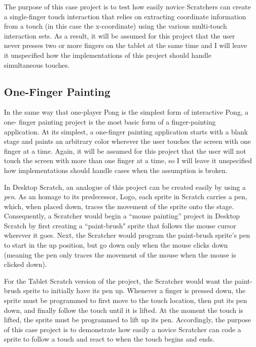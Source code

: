 The purpose of this case project is to test how easily novice Scratchers can create a single-finger touch interaction that relies on extracting coordinate information from a touch (in this case the x-coordinate) using the various multi-touch interaction sets. As a result, it will be assumed for this project that the user never presses two or more fingers on the tablet at the same time and I will leave it unspecified how the implementations of this project should handle simultaneous touches.

\subsection{One-Finger Painting}
In the same way that one-player Pong is the simplest form of interactive Pong, a one- finger painting project is the most basic form of a finger-painting application. At its simplest, a one-finger painting application starts with a blank stage and paints an arbitrary color wherever the user touches the screen with one finger at a time. Again, it will be assumed for this project that the user will not touch the screen with more than one finger at a time, so I will leave it unspecified how implementations should handle cases when the assumption is broken.

In Desktop Scratch, an analogue of this project can be created easily by using a \emph{pen}. As an homage to its predecessor, Logo, each sprite in Scratch carries a pen, which, when placed down, traces the movement of the sprite onto the stage. Consequently, a Scratcher would begin a ``mouse painting'' project in Desktop Scratch by first creating a ``paint-brush" sprite that follows the mouse cursor wherever it goes. Next, the Scratcher would program the paint-brush sprite's pen to start in the up position, but go down only when the mouse clicks down (meaning the pen only traces the movement of the mouse when the mouse is clicked down).

For the Tablet Scratch version of the project, the Scratcher would want the paint-brush sprite to initially have its pen up. Whenever a finger is pressed down, the sprite must be programmed to first move to the touch location, then put its pen down, and finally follow the touch until it is lifted. At the moment the touch is lifted, the sprite must be programmed to lift up its pen. Accordingly, the purpose of this case project is to demonstrate how easily a novice Scratcher can code a sprite to follow a touch and react to when the touch begins and ends.
 
